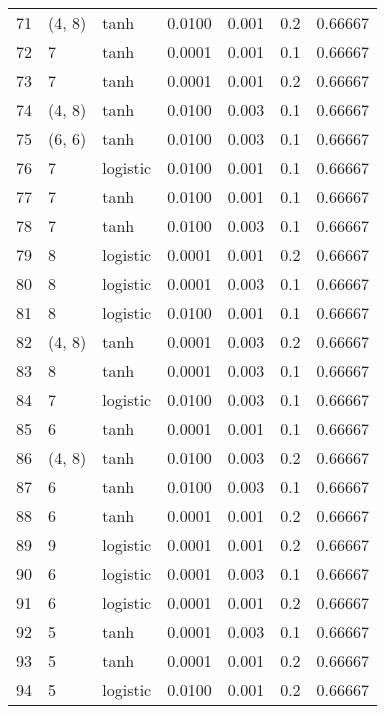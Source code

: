 \begin{tabular}{lllrrrr}
71  &      (4, 8) &      tanh &  0.0100 &  0.001 &  0.2 &   0.66667 \\
72  &           7 &      tanh &  0.0001 &  0.001 &  0.1 &   0.66667 \\
73  &           7 &      tanh &  0.0001 &  0.001 &  0.2 &   0.66667 \\
74  &      (4, 8) &      tanh &  0.0100 &  0.003 &  0.1 &   0.66667 \\
75  &      (6, 6) &      tanh &  0.0100 &  0.003 &  0.1 &   0.66667 \\
76  &           7 &  logistic &  0.0100 &  0.001 &  0.1 &   0.66667 \\
77  &           7 &      tanh &  0.0100 &  0.001 &  0.1 &   0.66667 \\
78  &           7 &      tanh &  0.0100 &  0.003 &  0.1 &   0.66667 \\
79  &           8 &  logistic &  0.0001 &  0.001 &  0.2 &   0.66667 \\
80  &           8 &  logistic &  0.0001 &  0.003 &  0.1 &   0.66667 \\
81  &           8 &  logistic &  0.0100 &  0.001 &  0.1 &   0.66667 \\
82  &      (4, 8) &      tanh &  0.0001 &  0.003 &  0.2 &   0.66667 \\
83  &           8 &      tanh &  0.0001 &  0.003 &  0.1 &   0.66667 \\
84  &           7 &  logistic &  0.0100 &  0.003 &  0.1 &   0.66667 \\
85  &           6 &      tanh &  0.0001 &  0.001 &  0.1 &   0.66667 \\
86  &      (4, 8) &      tanh &  0.0100 &  0.003 &  0.2 &   0.66667 \\
87  &           6 &      tanh &  0.0100 &  0.003 &  0.1 &   0.66667 \\
88  &           6 &      tanh &  0.0001 &  0.001 &  0.2 &   0.66667 \\
89  &           9 &  logistic &  0.0001 &  0.001 &  0.2 &   0.66667 \\
90  &           6 &  logistic &  0.0001 &  0.003 &  0.1 &   0.66667 \\
91  &           6 &  logistic &  0.0001 &  0.001 &  0.2 &   0.66667 \\
92  &           5 &      tanh &  0.0001 &  0.003 &  0.1 &   0.66667 \\
93  &           5 &      tanh &  0.0001 &  0.001 &  0.2 &   0.66667 \\
94  &           5 &  logistic &  0.0100 &  0.001 &  0.2 &   0.66667 \\

\end{tabular}
